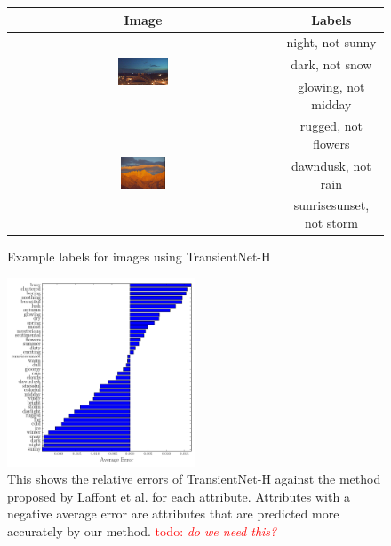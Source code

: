 \documentclass[10pt,twocolumn,letterpaper]{article}
\newcommand{\todo}[1]{\textcolor{red}{todo: {\em #1}}}
\begin{document}
\begin{figure}[t!]
  \renewcommand{\arraystretch}{1.6}
  \centering
  \begin{tabular}[b]{| c | c |}
    \hline
    Image & Labels \\
    \hline \hline
    \multirow{3}[3]{*}[-2mm]{\includegraphics[width=0.19\textwidth]{figs/labels_1.jpg}}
      & night, not sunny \bigstrut \\
      & dark, not snow \bigstrut  \\
      & glowing, not midday \bigstrut  \\
    \hline
    \multirow{3}[3]{*}[-1mm]{\includegraphics[width=0.17\textwidth]{figs/labels_2.jpg}}
      & rugged, not flowers \bigstrut  \\
      & dawndusk, not rain \bigstrut  \\
      & sunrisesunset, not storm  \bigstrut \\
    \hline
  \end{tabular}
  \caption{Example labels for images using TransientNet-H}
  \label{fig:labels}
\end{figure}

\begin{figure}[t!]
	\centering
		\includegraphics[width=0.5\textwidth]{figs/rel_err_cmr.pdf}
		\caption{This shows the relative errors of TransientNet-H against the method 
						 proposed by Laffont et al. for each attribute.  Attributes with a 
						 negative average error are attributes that are predicted more 
						 accurately by our method. \todo{do we need this?}}
		\label{fig:relerr}
\end{figure}
\end{document}
